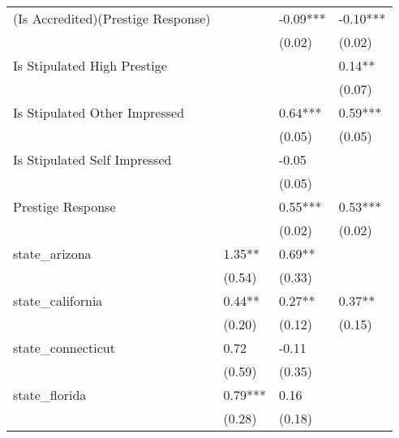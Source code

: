 \begin{table}
\begin{center}
\begin{tabular}{llll}
    (Is Accredited)(Prestige Response)             &                        & -0.09***     & -0.10***       \\
                                                   &                        & (0.02)       & (0.02)         \\
    Is Stipulated High Prestige                             &                        &              & 0.14**         \\
                                                   &                        &              & (0.07)         \\
    Is Stipulated Other Impressed               &                        & 0.64***      & 0.59***        \\
                                                   &                        & (0.05)       & (0.05)         \\
    Is Stipulated Self Impressed                &                        & -0.05        &                \\
                                                   &                        & (0.05)       &                \\
    Prestige Response                                  &                        & 0.55***      & 0.53***        \\
                                                   &                        & (0.02)       & (0.02)         \\
    state\_arizona                                 & 1.35**                 & 0.69**       &                \\
                                                   & (0.54)                 & (0.33)       &                \\
    state\_california                              & 0.44**                 & 0.27**       & 0.37**         \\
                                                   & (0.20)                 & (0.12)       & (0.15)         \\
    state\_connecticut                             & 0.72                   & -0.11        &                \\
                                                   & (0.59)                 & (0.35)       &                \\
    state\_florida                                 & 0.79***                & 0.16         &                \\
                                                   & (0.28)                 & (0.18)       &                \\

\end{tabular}
\end{center}
\end{table}
